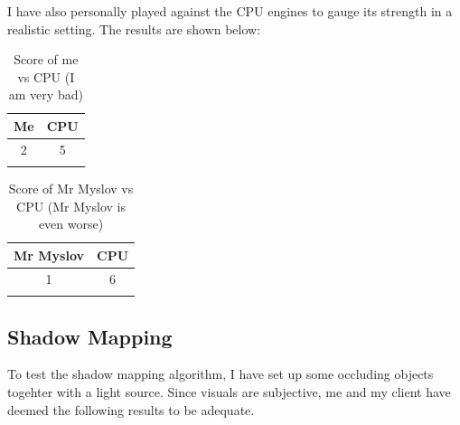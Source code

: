 \documentclass[../main/main.tex]{subfiles}
\begin{document}
I have also personally played against the CPU engines to gauge its strength in a realistic setting. The results are shown below:

\begin{longtable}[c]{c|c}
    \toprule
    \textbf{Me} & \textbf{CPU}\\
    \midrule
    \endhead

    2 & 5\\

    \bottomrule
    
\caption{Score of me vs CPU (I am very bad)}
\label{tab:me-cpu}
\end{longtable}

\begin{longtable}[c]{c|c}
    \toprule
    \textbf{Mr Myslov} & \textbf{CPU}\\
    \midrule
    \endhead

    1 & 6\\

    \bottomrule
    
\caption{Score of Mr Myslov vs CPU (Mr Myslov is even worse)}
\label{tab:myslov-cpu}
\end{longtable}

\subsection{Shadow Mapping}
To test the shadow mapping algorithm, I have set up some occluding objects togehter with a light source. Since visuals are subjective, me and my client have deemed the following results to be adequate.
\end{document}
